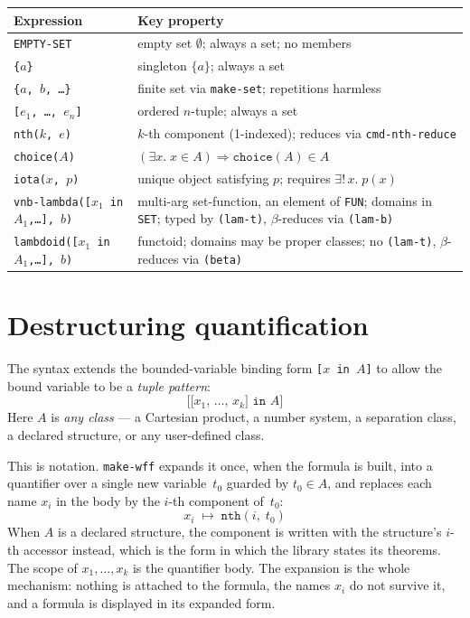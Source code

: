 \begin{center}
\footnotesize
\begin{tabular}{@{}p{5.2cm}p{7.1cm}@{}}
\toprule
Expression & Key property \\
\midrule
\texttt{EMPTY-SET} & empty set $\emptyset$; always a set; no members \\[2pt]
\texttt{\{$a$\}} & singleton $\{a\}$; always a set \\[2pt]
\texttt{\{$a$, $b$, \ldots\}} & finite set via \texttt{make-set}; repetitions harmless \\[2pt]
\texttt{[$e_1$, \ldots, $e_n$]} & ordered $n$-tuple; always a set \\[2pt]
\texttt{nth($k$, $e$)} & $k$-th component (1-indexed); reduces via \texttt{cmd-nth-reduce} \\[2pt]
\texttt{choice($A$)} & $(\exists x.\;x\in A) \Rightarrow \texttt{choice}(A) \in A$ \\[2pt]
\texttt{iota($x$, $p$)} & unique object satisfying $p$; requires $\exists!\,x.\;p(x)$ \\[2pt]
\texttt{vnb-lambda([$x_1$ in $A_1$,\ldots], $b$)} & multi-arg set-function, an element of \texttt{FUN}; domains in \texttt{SET}; typed by \texttt{(lam-t)}, $\beta$-reduces via \texttt{(lam-b)} \\[2pt]
\texttt{lambdoid([$x_1$ in $A_1$,\ldots], $b$)} & functoid; domains may be proper classes; no \texttt{(lam-t)}, $\beta$-reduces via \texttt{(beta)} \\
\bottomrule
\end{tabular}
\end{center}


\section{Destructuring quantification}

The syntax extends the bounded-variable binding form
\texttt{[$x$ in $A$]} to allow the bound variable to be a
\emph{tuple pattern}:
\[
  \texttt{[[$x_1$, \ldots, $x_k$] in $A$]}
\]
Here $A$ is \emph{any class} --- a Cartesian product, a number system,
a separation class, a declared structure, or any user-defined class.

This is notation.  \texttt{make-wff} expands it once, when the formula is
built, into a quantifier over a single new variable~$t_0$ guarded by
$t_0 \in A$, and replaces each name $x_i$ in the body by the $i$-th
component of~$t_0$:
\[
  x_i \;\longmapsto\; \texttt{nth}(i,\; t_0)
\]
When $A$ is a declared structure, the component is written with the
structure's $i$-th accessor instead, which is the form in which the
library states its theorems.  The scope of $x_1, \ldots, x_k$ is the
quantifier body.  The expansion is the whole mechanism: nothing is
attached to the formula, the names $x_i$ do not survive it, and a formula
is displayed in its expanded form.

